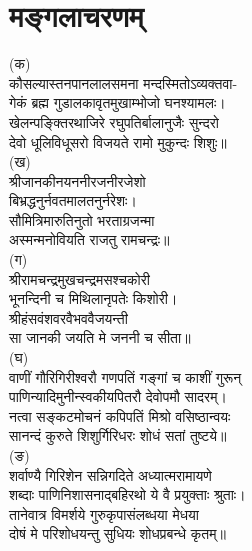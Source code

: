 %
%
%

\renewcommand\chaptername{}
\chapter[मङ्गलाचरणम्]{मङ्गलाचरणम्}
\fontsize{14}{20}\selectfont
\begin{center}
(क)\nopagebreak\\
कौसल्यास्तनपानलालसमना मन्दस्मितोऽव्यक्तवा-\nopagebreak\\
गेकं ब्रह्म गुडालकावृतमुखाम्भोजो घनश्यामलः।\nopagebreak\\
खेलन्पङ्क्तिरथाजिरे रघुपतिर्बालानुजैः सुन्दरो\nopagebreak\\
देवो धूलिविधूसरो विजयते रामो मुकुन्दः शिशुः॥\\
(ख)\nopagebreak\\
श्रीजानकीनयननीरजनीरजेशो\nopagebreak\\
बिभ्रद्धनुर्नवतमालतनुर्नरेशः।\nopagebreak\\
सौमित्रिमारुतिनुतो भरताग्रजन्मा\nopagebreak\\
अस्मन्मनोवियति राजतु रामचन्द्रः॥\\
(ग)\nopagebreak\\
श्रीरामचन्द्रमुखचन्द्रमसश्चकोरी\nopagebreak\\
भूनन्दिनी च मिथिलानृपतेः किशोरी।\nopagebreak\\
श्रीहंसवंशवरवैभववैजयन्ती\nopagebreak\\
सा जानकी जयति मे जननी च सीता॥\\
(घ)\nopagebreak\\
वाणीं गौरिगिरीश्वरौ गणपतिं गङ्गां च काशीं गुरून्\nopagebreak\\
पाणिन्यादिमुनीन्स्वकीयपितरौ देवोपमौ सादरम्।\nopagebreak\\
नत्वा सङ्कटमोचनं कपिपतिं मिश्रो वसिष्ठान्वयः\nopagebreak\\
सानन्दं कुरुते शिशुर्गिरिधरः शोधं सतां तुष्टये॥\\
(ङ)\nopagebreak\\
शर्वाण्यै गिरिशेन सन्निगदिते अध्यात्मरामायणे\nopagebreak\\
शब्दाः पाणिनिशासनाद्बहिरथो ये वै प्रयुक्ताः श्रुताः।\nopagebreak\\
तानेवात्र विमर्शये गुरुकृपासंलब्धया मेधया\nopagebreak\\
दोषं मे परिशोधयन्तु सुधियः शोधप्रबन्धे कृतम्॥\\
\end{center}

